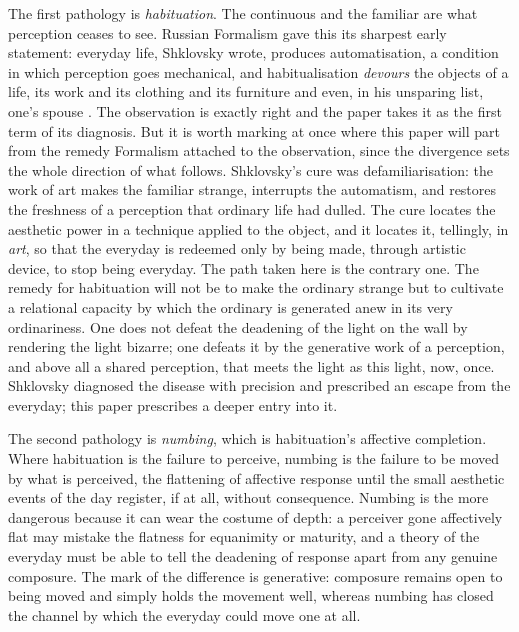 The first pathology is \emph{habituation}. The continuous and the familiar are what perception ceases to see. Russian Formalism gave this its sharpest early statement: everyday life, Shklovsky wrote, produces automatisation, a condition in which perception goes mechanical, and habitualisation \emph{devours} the objects of a life, its work and its clothing and its furniture and even, in his unsparing list, one's spouse \parencite{shklovsky1965}. The observation is exactly right and the paper takes it as the first term of its diagnosis. But it is worth marking at once where this paper will part from the remedy Formalism attached to the observation, since the divergence sets the whole direction of what follows. Shklovsky's cure was defamiliarisation: the work of art makes the familiar strange, interrupts the automatism, and restores the freshness of a perception that ordinary life had dulled. The cure locates the aesthetic power in a technique applied to the object, and it locates it, tellingly, in \emph{art}, so that the everyday is redeemed only by being made, through artistic device, to stop being everyday. The path taken here is the contrary one. The remedy for habituation will not be to make the ordinary strange but to cultivate a relational capacity by which the ordinary is generated anew in its very ordinariness. One does not defeat the deadening of the light on the wall by rendering the light bizarre; one defeats it by the generative work of a perception, and above all a shared perception, that meets the light as this light, now, once. Shklovsky diagnosed the disease with precision and prescribed an escape from the everyday; this paper prescribes a deeper entry into it.

The second pathology is \emph{numbing}, which is habituation's affective completion. Where habituation is the failure to perceive, numbing is the failure to be moved by what is perceived, the flattening of affective response until the small aesthetic events of the day register, if at all, without consequence. Numbing is the more dangerous because it can wear the costume of depth: a perceiver gone affectively flat may mistake the flatness for equanimity or maturity, and a theory of the everyday must be able to tell the deadening of response apart from any genuine composure. The mark of the difference is generative: composure remains open to being moved and simply holds the movement well, whereas numbing has closed the channel by which the everyday could move one at all.

